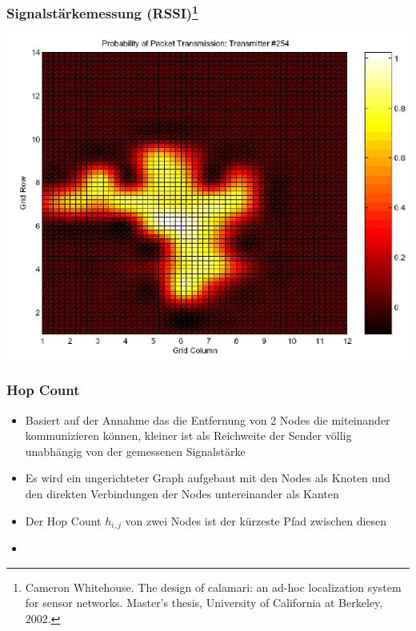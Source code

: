 \begin{frame}
\frametitle{Signalstärkemessung (RSSI)\footnote{Cameron Whitehouse. The design of calamari: an ad-hoc localization
system for sensor networks. Master’s thesis, University of California at
Berkeley, 2002.}}
  \begin{center}
  \includegraphics[scale=0.5]{img/RSSI1}

  \end{center}
\end{frame}

\begin{frame}
\frametitle{Hop Count}

\begin{itemize}
  \item Basiert auf der Annahme das die Entfernung von 2 Nodes die
    miteinander kommunizieren können, kleiner ist als Reichweite der
    Sender völlig unabhängig von der gemessenen Signalstärke
  \item Es wird ein ungerichteter Graph aufgebaut mit den Nodes als
    Knoten und den direkten Verbindungen der Nodes untereinander als
    Kanten
  \item Der Hop Count $h_{i,j}$ von zwei Nodes ist der kürzeste Pfad
    zwischen diesen
  \item 
\end{itemize}
\end{frame}

